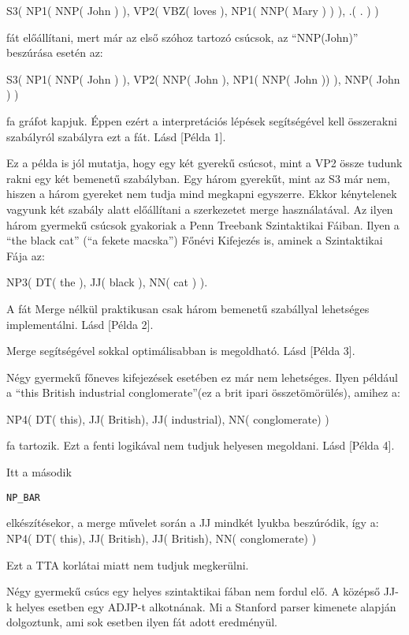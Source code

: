S3( NP1( NNP( John ) ), VP2( VBZ( loves ),  NP1( NNP( Mary ) ) ), .( . ) )

fát előállítani, mert már az első szóhoz tartozó csúcsok, az “NNP(John)” beszúrása esetén az:

S3( NP1( NNP( John ) ), VP2( NNP( John ),  NP1( NNP( John )) ), NNP( John ) )

fa gráfot kapjuk. Éppen ezért a interpretációs lépések segítségével kell összerakni szabályról szabályra ezt a fát. Lásd [Példa 1].

Ez a példa is jól mutatja, hogy egy két gyerekű csúcsot, mint a VP2 össze tudunk rakni egy két bemenetű szabályban. Egy három gyerekűt, mint az S3 már nem, hiszen a három gyereket nem tudja mind megkapni egyszerre. Ekkor kénytelenek vagyunk két szabály alatt előállítani a szerkezetet merge használatával. Az ilyen három gyermekű csúcsok gyakoriak a Penn Treebank Szintaktikai Fáiban.  Ilyen a “the black cat” (“a fekete macska”) Főnévi Kifejezés is, aminek a Szintaktikai Fája az:

NP3( DT( the ), JJ( black ), NN( cat ) ).

A fát Merge nélkül praktikusan csak három bemenetű szabállyal lehetséges implementálni.
Lásd [Példa 2].

Merge segítségével sokkal optimálisabban is megoldható. Lásd [Példa 3].

Négy gyermekű főneves kifejezések esetében ez már nem lehetséges. Ilyen például a “this British industrial conglomerate”(ez a brit ipari összetömörülés), amihez  a:

NP4( DT( this), JJ( British), JJ( industrial), NN( conglomerate) )

fa tartozik. Ezt a fenti logikával nem tudjuk helyesen megoldani. Lásd [Példa 4].

Itt a második\begin{verbatim}NP_BAR 
\end{verbatim}elkészítésekor, a merge művelet során a JJ  mindkét lyukba beszúródik, így a: NP4( DT( this), JJ( British), JJ( British), NN( conglomerate) )

Ezt a TTA korlátai miatt nem tudjuk megkerülni.

Négy gyermekű csúcs egy helyes szintaktikai fában nem fordul elő. A középső JJ-k helyes esetben egy ADJP-t alkotnának. Mi a Stanford parser kimenete alapján dolgoztunk, ami sok esetben ilyen fát adott eredményül.


